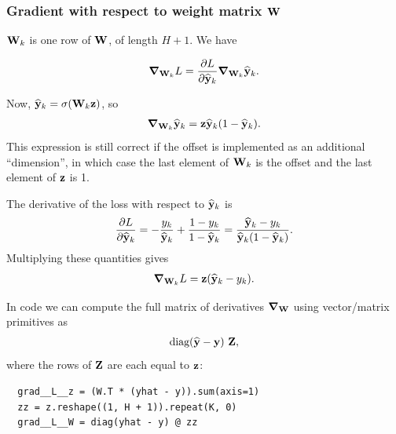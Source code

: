 


\subsubsection{Gradient with respect to weight matrix $\mathbf W$}

$\mathbf W_k$ is one row of $\mathbf W$, of length $H+ 1$. We have

\begin{align*}
  \grad_{\mathbf W_k} L = \frac{\partial L}{\partial \mathbf{\widehat{y}}_k}\grad_{\mathbf W_k} \mathbf{\widehat{y}}_k.
\end{align*}

Now, $\mathbf{\widehat{y}}_k = \sigma(\mathbf W_k\mathbf z)$, so
\begin{align*}
  \grad_{\mathbf W_k} \mathbf{\widehat{y}}_k = \mathbf z\mathbf{\widehat{y}}_k(1 - \mathbf{\widehat{y}}_k).
\end{align*}
This expression is still correct if the offset is implemented as an additional
``dimension'', in which case the last element of $\mathbf W_k$ is the offset and the
last element of $\mathbf z$ is 1.

The derivative of the loss with respect to $\mathbf{\widehat{y}}_k$ is
\begin{align*}
  \frac{\partial L}{\partial \mathbf{\widehat{y}}_k} =
  -\frac{y_k}{\mathbf{\widehat{y}}_k} + \frac{1 - y_k}{1 - \mathbf{\widehat{y}}_k} =
  \frac{\mathbf{\widehat{y}}_k - y_k}{\mathbf{\widehat{y}}_k(1 - \mathbf{\widehat{y}}_k)}.
\end{align*}
Multiplying these quantities gives
\begin{align*}
  \grad_{\mathbf W_k} L = \mathbf z(\mathbf{\widehat{y}}_k - y_k).
\end{align*}

In code we can compute the full matrix of derivatives $\grad_{\mathbf W}$ using
vector/matrix primitives as
\begin{align*}
  \operatorname{\text{diag}}(\mathbf{\mathbf{\widehat{y}}} - \mathbf y) ~ \mathbf Z,
\end{align*}
where the rows of $\mathbf Z$ are each equal to $\mathbf z$:

\begin{verbatim}
  grad__L__z = (W.T * (yhat - y)).sum(axis=1)
  zz = z.reshape((1, H + 1)).repeat(K, 0)
  grad__L__W = diag(yhat - y) @ zz
\end{verbatim}


